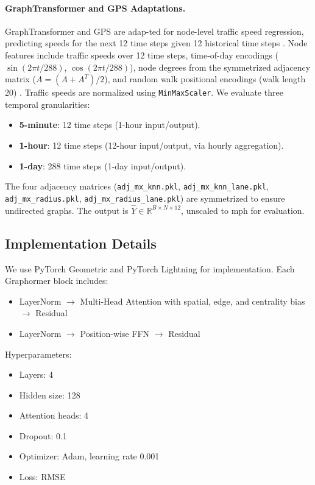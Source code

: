 \documentclass[runningheads]{llncs}
\begin{document}
\paragraph{GraphTransformer and GPS Adaptations.}
GraphTransformer and GPS are adap-ted for node-level traffic speed regression, predicting speeds for the next 12 time steps given 12 historical time steps \cite{li2018dcrnn}. Node features include traffic speeds over 12 time steps, time-of-day encodings (\(\sin(2\pi t / 288)\), \(\cos(2\pi t / 288)\)), node degrees from the symmetrized adjacency matrix (\( A = (A + A^T)/2 \)), and random walk positional encodings (walk length 20) \cite{rampasek2022gps}. Traffic speeds are normalized using \texttt{MinMaxScaler}. We evaluate three temporal granularities:
\begin{itemize}
    \item \textbf{5-minute}: 12 time steps (1-hour input/output).
    \item \textbf{1-hour}: 12 time steps (12-hour input/output, via hourly aggregation).
    \item \textbf{1-day}: 288 time steps (1-day input/output).
\end{itemize}
The four adjacency matrices (\texttt{adj\_mx\_knn.pkl}, \texttt{adj\_mx\_knn\_lane.pkl}, \\ \texttt{adj\_mx\_radius.pkl}, \texttt{adj\_mx\_radius\_lane.pkl}) are symmetrized to ensure undirected graphs. The output is \( \hat{Y} \in \mathbb{R}^{B \times N \times 12} \), unscaled to mph for evaluation.

\subsection{Implementation Details}
We use PyTorch Geometric and PyTorch Lightning for implementation. Each Graphormer block includes:
\begin{itemize}
    \item LayerNorm $\rightarrow$ Multi-Head Attention with spatial, edge, and centrality bias $\rightarrow$ Residual
    \item LayerNorm $\rightarrow$ Position-wise FFN $\rightarrow$ Residual
\end{itemize}

Hyperparameters:
\begin{itemize}
    \item Layers: 4
    \item Hidden size: 128
    \item Attention heads: 4
    \item Dropout: 0.1
    \item Optimizer: Adam, learning rate 0.001
    \item Loss: RMSE
\end{itemize}
\end{document}
